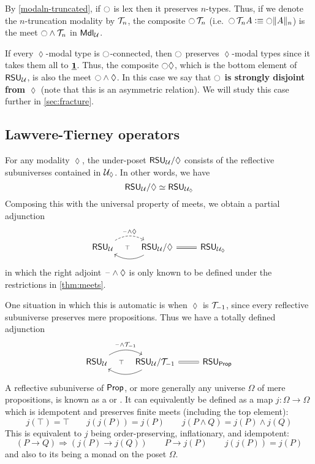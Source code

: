 \begin{eg}
  By \cref{modaln-truncated}, if $\modal$ is lex then it preserves $n$-types.
  Thus, if we denote the $n$-truncation modality by $\truncmod{n}$, the composite $\modal\,\truncmod{n}$ (i.e.\ $\modal\,\truncmod{n} A \defeq \modal \trunc n A$) is the meet $\modal\land\truncmod{n}$ in $\mdl$.
\end{eg}

\begin{eg}\label{eg:strongly-disjoint}
  If every $\lozenge$-modal type is $\modal$-connected, then $\modal$ preserves $\lozenge$-modal types since it takes them all to $\unit$.
  Thus, the composite $\modal\lozenge$, which is the bottom element of $\rsu$, is also the meet $\modal\land\lozenge$.
  In this case we say that \textbf{$\modal$ is strongly disjoint from $\lozenge$} (note that this is an asymmetric relation).
  We will study this case further in \cref{sec:fracture}.
\end{eg}


\subsection{Lawvere-Tierney operators}
\label{sec:ltop}

For any modality $\lozenge$, the under-poset $\rsu/\lozenge$ consists of the reflective subuniverses contained in $\UU_{\lozenge}$.
In other words, we have
\[ \rsu/\lozenge \eqvsym \rsu[\UU_{\lozenge}] \]
Composing this with the universal property of meets, we obtain a partial adjunction
\[
\begin{tikzcd}
  \rsu \ar[r,phantom,"\scriptstyle\top"] \ar[r,dashed,bend left,"\blank\land\lozenge"] & \rsu/\lozenge \ar[l,bend left] \ar[r,equals] & \rsu[\UU_{\lozenge}]
\end{tikzcd}
\]
in which the right adjoint $\blank\land\lozenge$ is only known to be defined under the restrictions in \cref{thm:meets}.

One situation in which this is automatic is when $\lozenge$ is $\truncmod{-1}$, since every reflective subuniverse preserves mere propositions.
Thus we have a totally defined adjunction
\begin{equation}
\begin{tikzcd}
  \rsu \ar[r,phantom,"\scriptstyle\top"] \ar[r,bend left,"\blank\land\truncmod{-1}"] & \rsu/\truncmod{-1} \ar[l,bend left] \ar[r,equals] & \rsu[\prop]
\end{tikzcd}\label{eq:meet-brck}
\end{equation}
A reflective subuniverse of $\prop$, or more generally any universe $\Omega$ of mere propositions, is known as a  or .
It can equivalently be defined as a map $j:\Omega\to\Omega$ which is idempotent and preserves finite meets (including the top element):
\[ j(\top)=\top \qquad j(j(P)) = j(P) \qquad j(P\land Q) = j(P) \land j(Q) \]
This is equivalent to $j$ being order-preserving, inflationary, and idempotent:
\[ (P\to Q) \Rightarrow (j(P) \to j(Q)) \qquad P\to j(P) \qquad j(j(P)) = j(P) \]
and also to its being a monad on the poset $\Omega$.

